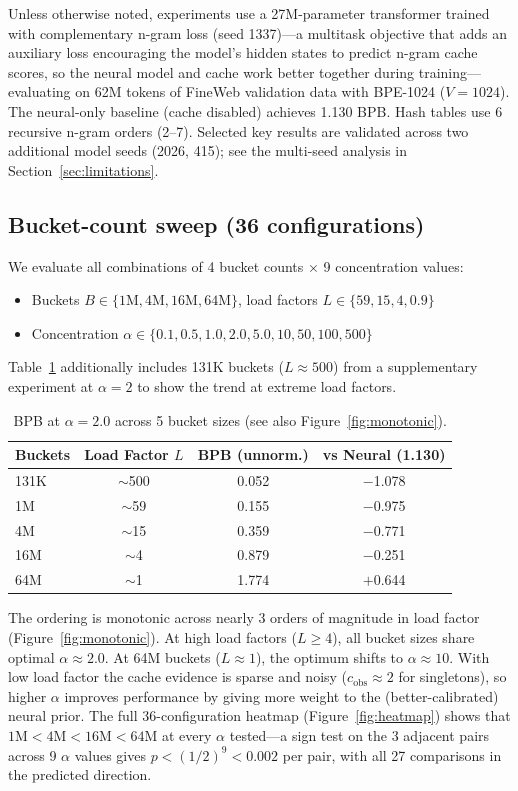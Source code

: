 \documentclass[11pt]{article}
\begin{document}
Unless otherwise noted, experiments use a 27M-parameter transformer trained with complementary n-gram loss (seed 1337)---a multitask objective that adds an auxiliary loss encouraging the model's hidden states to predict n-gram cache scores, so the neural model and cache work better together during training---evaluating on 62M tokens of FineWeb validation data with BPE-1024 ($V = 1024$). The neural-only baseline (cache disabled) achieves 1.130 BPB. Hash tables use 6 recursive n-gram orders (2--7). Selected key results are validated across two additional model seeds (2026, 415); see the multi-seed analysis in Section~\ref{sec:limitations}.

\subsection{Bucket-count sweep (36 configurations)}

We evaluate all combinations of 4 bucket counts $\times$ 9 concentration values:
\begin{itemize}
\item Buckets $B \in \{1\text{M}, 4\text{M}, 16\text{M}, 64\text{M}\}$, load factors $L \in \{59, 15, 4, 0.9\}$
\item Concentration $\alpha \in \{0.1, 0.5, 1.0, 2.0, 5.0, 10, 50, 100, 500\}$
\end{itemize}
Table~\ref{tab:exp1} additionally includes 131K buckets ($L \approx 500$) from a supplementary experiment at $\alpha = 2$ to show the trend at extreme load factors.

\begin{table}[h]
\centering
\caption{BPB at $\alpha = 2.0$ across 5 bucket sizes (see also Figure~\ref{fig:monotonic}).}
\label{tab:exp1}
\begin{tabular}{lccc}
\toprule
Buckets & Load Factor $L$ & BPB (unnorm.) & vs Neural (1.130) \\
\midrule
131K & $\sim$500 & 0.052 & $-$1.078 \\
1M & $\sim$59 & 0.155 & $-$0.975 \\
4M & $\sim$15 & 0.359 & $-$0.771 \\
16M & $\sim$4 & 0.879 & $-$0.251 \\
64M & $\sim$1 & 1.774 & $+$0.644 \\
\bottomrule
\end{tabular}
\end{table}

The ordering is monotonic across nearly 3 orders of magnitude in load factor (Figure~\ref{fig:monotonic}). At high load factors ($L \geq 4$), all bucket sizes share optimal $\alpha \approx 2.0$. At 64M buckets ($L \approx 1$), the optimum shifts to $\alpha \approx 10$. With low load factor the cache evidence is sparse and noisy ($c_{\text{obs}} \approx 2$ for singletons), so higher $\alpha$ improves performance by giving more weight to the (better-calibrated) neural prior. The full 36-configuration heatmap (Figure~\ref{fig:heatmap}) shows that $1\text{M} < 4\text{M} < 16\text{M} < 64\text{M}$ at every $\alpha$ tested---a sign test on the 3 adjacent pairs across 9 $\alpha$ values gives $p < (1/2)^9 < 0.002$ per pair, with all 27 comparisons in the predicted direction.
\end{document}

